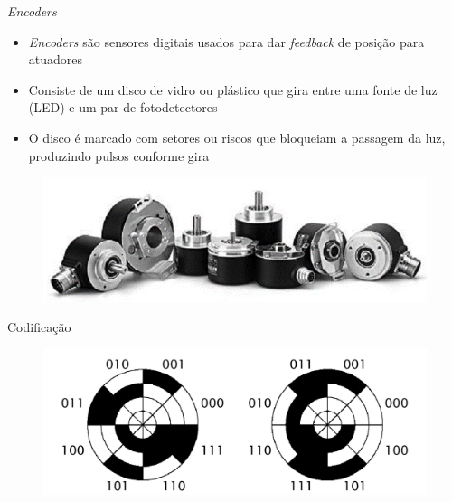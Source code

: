 \documentclass[aspectratio=169,
				xcolor=table]{beamer}
\begin{document}
		\begin{frame}{\textit{Encoders}}
			\begin{itemize}
				\item \textit{Encoders} são sensores digitais usados para dar \textit{feedback} de posição para atuadores
				\item Consiste de um disco de vidro ou plástico que gira entre uma fonte de luz (LED) e um par de fotodetectores
				\item O disco é marcado com setores ou riscos que bloqueiam a passagem da luz, produzindo pulsos conforme gira
			\end{itemize}
			\begin{figure}
				\centering
				\includegraphics[scale=.35]{../figs/cap03/Imagem35}			
			\end{figure}	
		\end{frame}
		
		\begin{frame}{Codificação}
			\begin{figure}
				\centering
				\includegraphics[scale=.35]{../figs/cap03/Imagem40}			
			\end{figure}			
		\end{frame}
		
\end{document}
